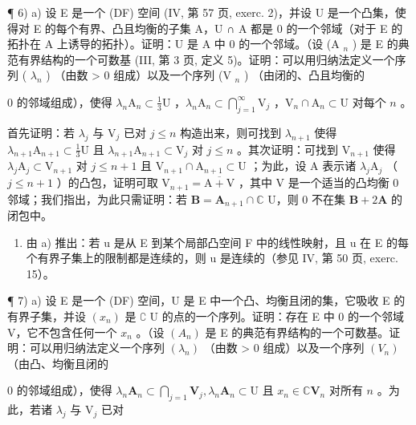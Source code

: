 ¶ 6) a) 设 E 是一个 (DF) 空间 (IV, 第 57 页, exerc. 2)，并设 U 是一个凸集，使得对 E 的每个有界、凸且均衡的子集 A，U ∩ A 都是 0 的一个邻域（对于 E 的拓扑在 A 上诱导的拓扑）。证明：U 是 A 中 0 的一个邻域。（设 (A \(_{n}\) ) 是 E 的典范有界结构的一个可数基 (III, 第 3 页, 定义 5)。证明：可以用归纳法定义一个序列 ( \(\lambda_{n}\) ) （由数 \textgreater{} 0 组成）以及一个序列 (V \(_{n}\) ) （由闭的、凸且均衡的

0 的邻域组成），使得 \(\lambda_{n}\mathrm{A}_{n} \subset \frac{1}{3}\mathrm{U}\) ，\(\lambda_{n}\mathrm{A}_{n} \subset \bigcap_{j=1}^{\infty} \mathrm{V}_{j}\) ，\(\mathrm{V}_{n} \cap \mathrm{A}_{n} \subset \mathrm{U}\) 对每个 \(n\) 。

首先证明：若 \(\lambda_{j}\) 与 \(\mathrm{V}_j\) 已对 \(j\leqslant n\) 构造出来，则可找到 \(\lambda_{n + 1}\) 使得 \(\lambda_{n + 1}\mathrm{A}_{n + 1}\subset \frac{1}{3}\mathrm{U}\) 且 \(\lambda_{n + 1}\mathrm{A}_{n + 1}\subset \mathrm{V}_j\) 对 \(j\leqslant n\) 。其次证明：可找到 \(\mathrm{V}_{n + 1}\) 使得 \(\lambda_j\mathrm{A}_j\subset \mathrm{V}_{n + 1}\) 对 \(j\leqslant n + 1\) 且 \(\mathrm{V}_{n + 1}\cap \mathrm{A}_{n + 1}\subset \mathrm{U}\) ；为此，设 A 表示诸 \(\lambda_{j}\mathrm{A}_{j}\) （\(j\leqslant n + 1\) ）的凸包，证明可取 \(\mathrm{V}_{n + 1} = \overline{\mathrm{A} + \mathrm{V}}\) ，其中 V 是一个适当的凸均衡 0 邻域；我们指出，为此只需证明：若 \(\mathbf{B} = \mathbf{A}_{n + 1}\cap \mathbb{C}\) U，则 0 不在集 \(\mathbf{B} + 2\mathbf{A}\) 的闭包中。

\begin{enumerate}
\def\labelenumi{\alph{enumi})}
\setcounter{enumi}{1}
\tightlist
\item
  由 a) 推出：若 u 是从 E 到某个局部凸空间 F 中的线性映射，且 u 在 E 的每个有界子集上的限制都是连续的，则 u 是连续的（参见 IV, 第 50 页, exerc. 15）。
\end{enumerate}

¶ 7) a) 设 E 是一个 (DF) 空间，U 是 E 中一个凸、均衡且闭的集，它吸收 E 的有界子集，并设 \((x_n)\) 是 \(\complement\) U 的点的一个序列。证明：存在 E 中 0 的一个邻域 V，它不包含任何一个 \(x_n\) 。（设 \((A_n)\) 是 E 的典范有界结构的一个可数基。证明：可以用归纳法定义一个序列 \((\lambda_n)\) （由数 \textgreater{} 0 组成）以及一个序列 \((V_n)\) （由凸、均衡且闭的

0 的邻域组成），使得 \(\lambda_{n}\mathbf{A}_{n}\subset \bigcap_{j = 1}\mathbf{V}_{j},\lambda_{n}\mathbf{A}_{n}\subset \mathrm{U}\) 且 \(x_{n}\in \mathbb{C}\mathbf{V}_{n}\) 对所有 \(n\) 。为此，若诸 \(\lambda_{j}\) 与 \(\mathrm{V}_j\) 已对

